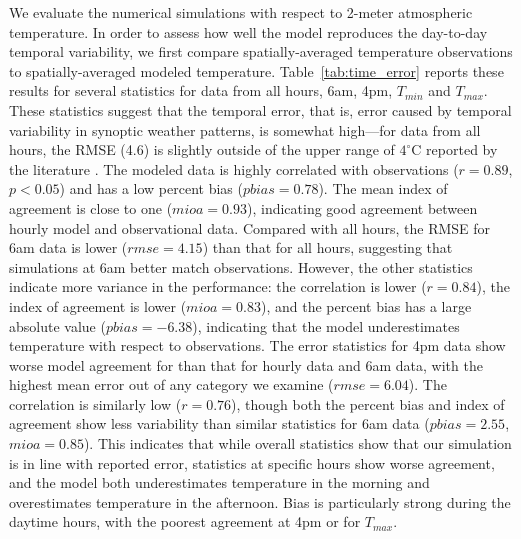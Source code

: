 We evaluate the numerical simulations with respect to 2-meter atmospheric temperature. In order to assess how well the model reproduces the day-to-day temporal variability, we first compare spatially-averaged temperature observations to spatially-averaged modeled temperature. Table~\ref{tab:time_error} reports these results for several statistics for data from all hours, 6am, 4pm, $T_{min}$ and $T_{max}$.  
These statistics suggest that the temporal error, that is, error caused by temporal variability in synoptic weather patterns, is somewhat high---for data from all hours, the RMSE (4.6) is slightly outside of the upper range of $4^\circ$C reported by the literature \citep{kim2013evaluation}. 
The modeled data is highly correlated with observations ($r=0.89$, $p<0.05$) and has a low percent bias ($pbias = 0.78$). The mean index of agreement is close to one ($mioa=0.93$), indicating good agreement between hourly model and observational data.
Compared with all hours, the RMSE for 6am data is lower ($rmse= 4.15$) than that for all hours, suggesting that simulations at 6am better match observations. However, the other statistics indicate more variance in the performance:  the correlation is lower ($r=0.84$), the index of agreement is lower ($mioa=0.83$), and the percent bias has a large absolute value ($pbias=-6.38$), indicating that the model underestimates temperature with respect to observations. 
%
The error statistics for 4pm data show worse model agreement for than that for hourly data and 6am data, with the highest mean error out of any category we examine ($rmse=6.04$). The correlation is similarly low ($r=0.76$), though both the percent bias and index of agreement show less variability than similar statistics for 6am data ($pbias=2.55$, $mioa=0.85$). This indicates that while overall statistics show that our simulation is in line with reported error, statistics at specific hours show worse agreement, and the model both underestimates temperature in the morning and overestimates temperature in the afternoon. Bias is particularly strong during the daytime hours, with the poorest agreement at 4pm or for $T_{max}$. 

